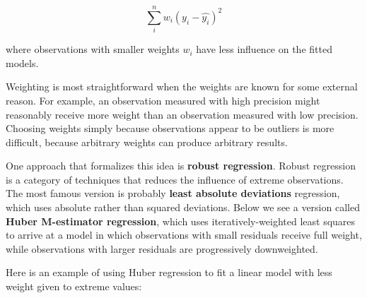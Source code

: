 \documentclass[
  13,
  letterpaper,
]{report}
\begin{document}
\[\sum_i^n{w_i\left(y_i-\hat{y_i}\right)^2}\]

where observations with smaller weights \(w_i\) have less influence on
the fitted models.

Weighting is most straightforward when the weights are known for some
external reason. For example, an observation measured with high
precision might reasonably receive more weight than an observation
measured with low precision. Choosing weights simply because
observations appear to be outliers is more difficult, because arbitrary
weights can produce arbitrary results.

One approach that formalizes this idea is \textbf{robust regression}.
Robust regression is a category of techniques that reduces the influence
of extreme observations. The most famous version is probably
\textbf{least absolute deviations} regression, which uses absolute
rather than squared deviations. Below we see a version called
\textbf{Huber M-estimator regression}, which uses iteratively-weighted
least squares to arrive at a model in which observations with small
residuals receive full weight, while observations with larger residuals
are progressively downweighted.

Here is an example of using Huber regression to fit a linear model with
less weight given to extreme values:
\end{document}
